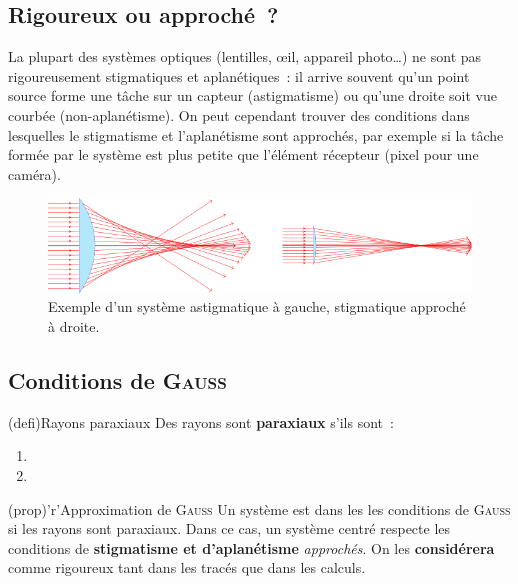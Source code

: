 \documentclass[../../main/main.tex]{subfiles}
\begin{document}
\subsection{Rigoureux ou approché~?}

La plupart des systèmes optiques (lentilles, œil, appareil photo…) ne sont pas
rigoureusement stigmatiques et aplanétiques~: il arrive souvent qu'un point
source forme une tâche sur un capteur (astigmatisme) ou qu'une droite soit vue
courbée (non-aplanétisme). On peut cependant trouver des conditions
dans lesquelles le stigmatisme et l'aplanétisme sont approchés, par exemple si
la tâche formée par le système est plus petite que l'élément récepteur (pixel
pour une caméra).

\begin{figure}[htbp]
	\centering
	\includegraphics[scale=.95]{stig}
	\caption{Exemple d'un système astigmatique à gauche, stigmatique approché à
		droite.}
	\label{fig:stig}
\end{figure}

\vspace{-15pt}
\subsection{Conditions de \textsc{Gauss}}

\begin{tcb*}[label=def:gausscond](defi){Rayons paraxiaux}
	Des rayons sont \textbf{paraxiaux} s'ils sont~:
	\begin{enumerate}
		\item {}
		\item {}
	\end{enumerate}
\end{tcb*}
\begin{tcb*}[label=prop:gaussprop](prop)'r'{Approximation de \textsc{Gauss}}
	Un système est dans les les conditions de \textsc{Gauss} si les rayons sont
	paraxiaux. Dans ce cas, un système centré respecte les conditions de
	\textbf{stigmatisme et d'aplanétisme} \textit{approchés}. On
	les \textbf{considérera} comme rigoureux tant dans les tracés que dans les
	calculs.
\end{tcb*}
\vspace{-15pt}
\end{document}
